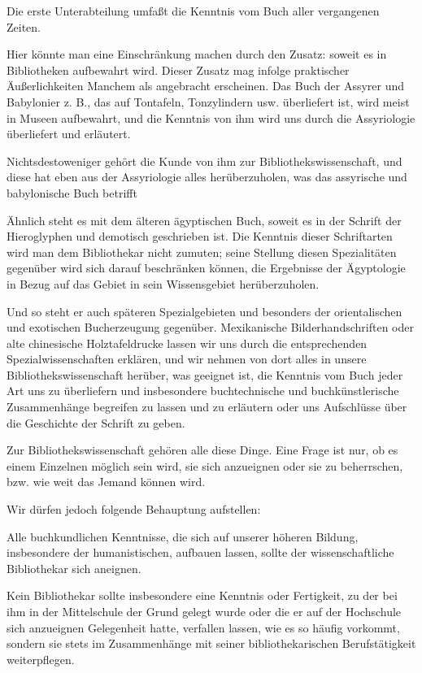 \documentclass[a4paper,
fontsize=11pt,
oneside,
numbers=noperiodatend,
parskip=half-,
bibliography=totoc,
final
]{scrartcl}
\begin{document}
Die erste Unterabteilung umfaßt die Kenntnis vom Buch aller vergangenen
Zeiten.

Hier könnte man eine Einschränkung machen durch den Zusatz: soweit es in
Bibliotheken aufbewahrt wird. Dieser Zusatz mag infolge praktischer
Äußerlichkeiten Manchem als angebracht erscheinen. Das Buch der Assyrer
und Babylonier z. B., das auf Tontafeln, Tonzylindern usw. überliefert
ist, wird meist in Museen aufbewahrt, und die Kenntnis von ihm wird uns
durch die Assyriologie überliefert und erläutert.

Nichtsdestoweniger gehört die Kunde von ihm zur Bibliothekswissenschaft,
und diese hat eben aus der Assyriologie alles herüberzuholen, was das
assyrische und babylonische Buch betrifft

Ähnlich steht es mit dem älteren ägyptischen Buch, soweit es in der
Schrift der Hieroglyphen und demotisch geschrieben ist. Die Kenntnis
dieser Schriftarten wird man dem Bibliothekar nicht zumuten; seine
Stellung diesen Spezialitäten gegenüber wird sich darauf beschränken
können, die Ergebnisse der Ägyptologie in Bezug auf das Gebiet in sein
Wissensgebiet herüberzuholen.

Und so steht er auch späteren Spezialgebieten und besonders der
orientalischen und exotischen Bucherzeugung gegenüber. Mexikanische
Bilderhandschriften oder alte chinesische Holztafeldrucke lassen wir uns
durch die entsprechenden Spezialwissenschaften erklären, und wir nehmen
von dort alles in unsere Bibliothekswissenschaft herüber, was geeignet
ist, die Kenntnis vom Buch jeder Art uns zu überliefern und insbesondere
buchtechnische und buchkünstlerische Zusammenhänge begreifen zu lassen
und zu erläutern oder uns Aufschlüsse über die Geschichte der Schrift zu
geben.

Zur Bibliothekswissenschaft gehören alle diese Dinge. Eine Frage ist
nur, ob es einem Einzelnen möglich sein wird, sie sich anzueignen oder
sie zu beherrschen, bzw. wie weit das Jemand können wird.

Wir dürfen jedoch folgende Behauptung aufstellen:

Alle buchkundlichen Kenntnisse, die sich auf unserer höheren Bildung,
insbesondere der humanistischen, aufbauen lassen, sollte der
wissenschaftliche Bibliothekar sich aneignen.

Kein Bibliothekar sollte insbesondere eine Kenntnis oder Fertigkeit, zu
der bei ihm in der Mittelschule der Grund gelegt wurde oder die er auf
der Hochschule sich anzueignen Gelegenheit hatte, verfallen lassen, wie
es so häufig vorkommt, sondern sie stets im Zusammenhänge mit seiner
bibliothekarischen Berufstätigkeit weiterpflegen.
\end{document}
